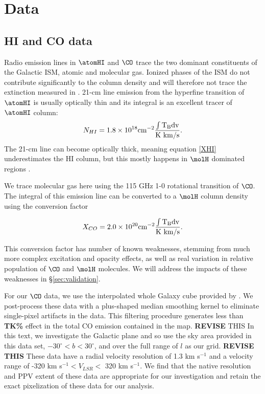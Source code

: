 \section{Data}
\label{sec:data}
\subsection{HI and CO data}

Radio emission lines in $\atomHI$ and $\CO$ trace the two dominant constituents of the Galactic ISM, atomic and molecular gas. 
Ionized phases of the ISM do not contribute significantly to the column density and will therefore not trace the extinction measured in \citet{Green_2015}. 
21-cm line emission from the hyperfine transition of $\atomHI$ is usually optically thin and its integral is an excellent tracer of $\atomHI$ column:
\begin{equation}\label{XHI}
N_{HI} = 1.8 \times 10^{18} \rm cm^{-2} \frac{ \int T_B dv}{\rm K~km/s}.
\end{equation}
The 21-cm line can become optically thick, meaning equation \ref{XHI} underestimates the HI column, but this mostly happens in $\molH$ dominated regions \citep{Goldsmith_2007}. 

We trace molecular gas here using the 115 GHz 1-0 rotational transition of $\CO$. 
The integral of this emission line can be converted to a $\molH$ column density using the conversion factor \citep{Bolatto_2013}

\begin{equation}\label{XCO}
X_{CO} = 2.0 \times 10^{20} \rm cm^{-2} \frac{ \int T_B dv}{\rm K~km/s}.
\end{equation}

This conversion factor has number of known weaknesses, stemming from much more complex excitation and opacity effects, as well as real variation in relative population of $\CO$ and $\molH$ molecules. 
We will address the impacts of these weaknesses in \S \ref{sec:validation}. 

For our $\CO$ data, we use the interpolated whole Galaxy cube provided by \citet{Dame_2001}. 
We post-process these data with a plus-shaped median smoothing kernel to eliminate single-pixel artifacts in the data. 
This filtering procedure generates less than {\bf TK\%} effect in the total CO emission contained in the map. 
{\bf REVISE} THIS In this text, we investigate the Galactic plane and so use the sky area provided in this data set, $-30^\circ < b < 30^\circ$, and over the full range of $l$ as our grid. {\bf REVISE THIS}
These data have a radial velocity resolution of 1.3 km s$^{-1}$ and a velocity range of -320 km s$^{-1} < V_{LSR} <$ 320 km s$^{-1}$. 
We find that the native resolution and PPV extent of these data are appropriate for our investigation and retain the exact pixelization of these data for our analysis. 

